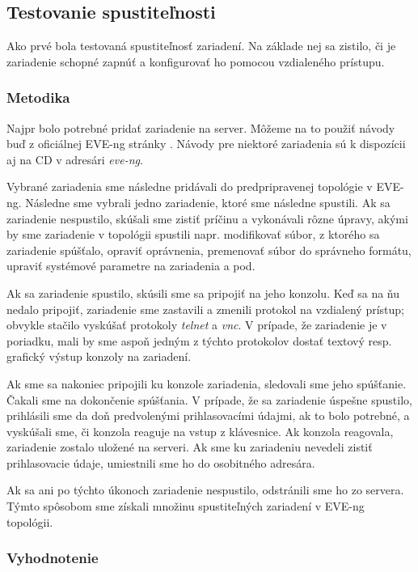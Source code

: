 \subsection{Testovanie spustiteľnosti}
\label{chap:test_spust}

Ako prvé bola testovaná spustiteľnosť zariadení. Na základe nej sa zistilo, či je zariadenie schopné zapnúť a konfigurovať ho pomocou vzdialeného prístupu.



\subsubsection{Metodika}

Najpr bolo potrebné pridať zariadenie na server. Môžeme na to použiť návody buď z oficiálnej EVE-ng stránky \cite{eve_ng_howtos}. Návody pre niektoré zariadenia sú k dispozícii aj na CD v adresári \emph{eve-ng}.

Vybrané zariadenia sme následne pridávali do predpripravenej topológie v EVE-ng. Následne sme vybrali jedno zariadenie, ktoré sme následne spustili. Ak sa zariadenie nespustilo, skúšali sme zistiť príčinu a vykonávali rôzne úpravy, akými by sme zariadenie v topológii spustili napr. modifikovať súbor, z ktorého sa zariadenie spúšťalo, opraviť oprávnenia, premenovať súbor do správneho formátu, upraviť systémové parametre na zariadenia a pod.

Ak sa zariadenie spustilo, skúsili sme sa pripojiť na jeho konzolu. Keď sa na ňu nedalo pripojiť, zariadenie sme zastavili a zmenili protokol na vzdialený prístup; obvykle stačilo vyskúšať protokoly \emph{telnet} a \emph{vnc}. V prípade, že zariadenie je v poriadku, mali by sme aspoň jedným z týchto protokolov dostať textový resp. grafický výstup konzoly na zariadení.

Ak sme sa nakoniec pripojili ku konzole zariadenia, sledovali sme jeho spúšťanie. Čakali sme na dokončenie spúšťania. V prípade, že sa zariadenie úspešne spustilo, prihlásili sme da doň predvolenými prihlasovacími údajmi, ak to bolo potrebné, a vyskúšali sme, či konzola reaguje na vstup z klávesnice. Ak konzola reagovala, zariadenie zostalo uložené na serveri. Ak sme ku zariadeniu nevedeli zistiť prihlasovacie údaje, umiestnili sme ho do osobitného adresára.

Ak sa ani po týchto úkonoch zariadenie nespustilo, odstránili sme ho zo servera. Týmto spôsobom sme získali množinu spustiteľných zariadení v EVE-ng topológii.

\subsubsection{Vyhodnotenie}

